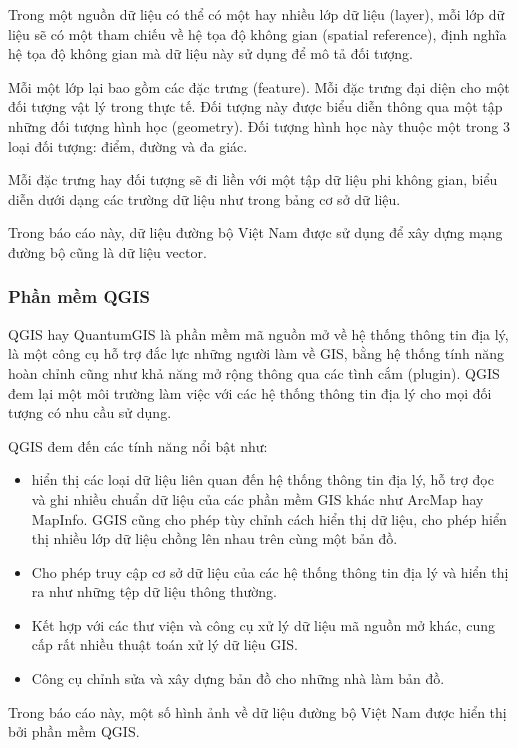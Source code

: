 \documentclass[14pt, oneside, a4paper, openany]{scrartcl}
\begin{document}
Trong một nguồn dữ liệu có thể có một hay nhiều lớp dữ liệu (layer), mỗi lớp dữ liệu sẽ có một tham chiếu về hệ tọa độ không gian (spatial reference), định nghĩa hệ tọa độ không gian mà dữ liệu này sử dụng để mô tả đối tượng.

Mỗi một lớp lại bao gồm các đặc trưng (feature). Mỗi đặc trưng đại diện cho một đối tượng vật lý trong thực tế. Đối tượng này được biểu diễn thông qua một tập những đối tượng hình học (geometry). Đối tượng hình học này thuộc một trong 3 loại đối tượng: điểm, đường và đa giác.

Mỗi đặc trưng hay đối tượng sẽ đi liền với một tập dữ liệu phi không gian, biểu diễn dưới dạng các trường dữ liệu như trong bảng cơ sở dữ liệu.

Trong báo cáo này, dữ liệu đường bộ Việt Nam được sử dụng để xây dựng mạng đường bộ cũng là dữ liệu vector.

\subsubsection{Phần mềm QGIS}
\cite{qgis} QGIS hay QuantumGIS là phần mềm mã nguồn mở về hệ thống thông tin địa lý, là một công cụ hỗ trợ đắc lực những người làm về GIS, bằng hệ thống tính năng hoàn chỉnh cũng như khả năng mở rộng thông qua các tình cắm (plugin).
QGIS đem lại một môi trường làm việc với các hệ thống thông tin địa lý cho mọi đối tượng có nhu cầu sử dụng.

QGIS đem đến các tính năng nổi bật như:
\begin{itemize}
	\item hiển thị các loại dữ liệu liên quan đến hệ thống thông tin địa lý, hỗ trợ đọc và ghi nhiều chuẩn dữ liệu của các phần mềm GIS khác như ArcMap hay MapInfo. GGIS cũng cho phép tùy chỉnh cách hiển thị dữ liệu, cho phép hiển thị nhiều lớp dữ liệu chồng lên nhau trên cùng một bản đồ.
	\item Cho phép truy cập cơ sở dữ liệu của các hệ thống thông tin địa lý và hiển thị ra như những tệp dữ liệu thông thường.
	\item Kết hợp với các thư viện và công cụ xử lý dữ liệu mã nguồn mở khác, cung cấp rất nhiều thuật toán xử lý dữ liệu GIS.
	\item Công cụ chỉnh sửa và xây dựng bản đồ cho những nhà làm bản đồ.
\end{itemize}

Trong báo cáo này, một số hình ảnh về dữ liệu đường bộ Việt Nam được hiển thị bởi phần mềm QGIS.
\end{document}
